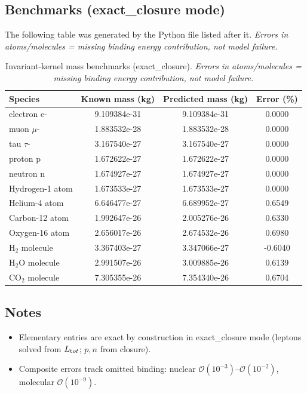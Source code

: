 \documentclass[10pt,reprint,aps,onecolumn,nofootinbib]{revtex4-2}
\begin{document}
    \subsection{Benchmarks (exact\_closure mode)}
    \label{sec:benchmarks-exact-closure}
    The following table was generated by the Python file listed after it.
    \emph{Errors in atoms/molecules = missing binding energy contribution, not model failure.}

    \begin{table}[H]
        \centering
        \caption{Invariant-kernel mass benchmarks (exact\_closure). \emph{Errors in atoms/molecules = missing binding energy contribution, not model failure.}}
        \begin{tabular}{lccc}
            \toprule
            Species & Known mass (kg) & Predicted mass (kg) & Error (\%)\\
            \midrule
            electron e- & 9.109384e-31 & 9.109384e-31 & 0.0000\\
            muon $\mu$- & 1.883532e-28 & 1.883532e-28 & 0.0000\\
            tau $\tau$- & 3.167540e-27 & 3.167540e-27 & 0.0000\\
            proton p & 1.672622e-27 & 1.672622e-27 & 0.0000\\
            neutron n & 1.674927e-27 & 1.674927e-27 & 0.0000\\
            Hydrogen-1 atom & 1.673533e-27 & 1.673533e-27 & 0.0000\\
            Helium-4 atom & 6.646477e-27 & 6.689952e-27 & 0.6549\\
            Carbon-12 atom & 1.992647e-26 & 2.005276e-26 & 0.6330\\
            Oxygen-16 atom & 2.656017e-26 & 2.674532e-26 & 0.6980\\
            H$_2$ molecule & 3.367403e-27 & 3.347066e-27 & -0.6040\\
            H$_2$O molecule & 2.991507e-26 & 3.009885e-26 & 0.6139\\
            CO$_2$ molecule & 7.305355e-26 & 7.354340e-26 & 0.6704\\
            \bottomrule
        \end{tabular}\label{tab:benchmarks-exact-closure}
    \end{table}

    \subsection*{Notes}
    \begin{itemize}
        \item Elementary entries are exact by construction in exact\_closure mode (leptons solved from $L_{\textrm tot}$; $p,n$ from closure).
        \item Composite errors track omitted binding: nuclear $\mathcal O(10^{-3})$–$\mathcal O(10^{-2})$, molecular $\mathcal O(10^{-9})$.
    \end{itemize}
\end{document}
